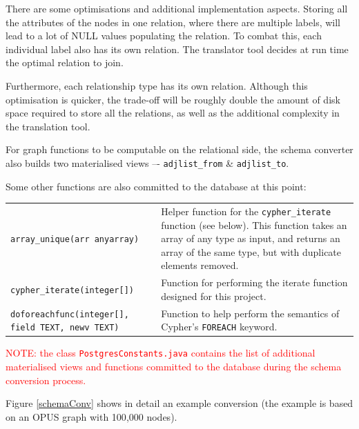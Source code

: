 \documentclass[letterpaper]{ltxdoc}
\begin{document}
There are some optimisations and additional implementation aspects. Storing all the attributes of the nodes in one relation, where there are multiple labels, will lead to a lot of NULL values populating the relation. To combat this, each individual label also has its own relation. The translator tool decides at run time the optimal relation to join.

Furthermore, each relationship type has its own relation. Although this optimisation is quicker, the trade-off will be roughly double the amount of disk space required to store all the relations, as well as the additional complexity in the translation tool.

For graph functions to be computable on the relational side, the schema converter also builds two materialised views –- \texttt{adjlist\_from} \& \texttt{adjlist\_to}.

Some other functions are also committed to the database at this point:

\begin{center}
\begin{tabular}{ p{4.5cm} p{9cm} }
\texttt{array\_unique(arr anyarray)} & Helper function for the \texttt{cypher\_iterate} function (see below). This function takes an array of any type as input, and returns an array of the same type, but with duplicate elements removed. \\

\texttt{cypher\_iterate(integer[])} & Function for performing the iterate function designed for this project. \\

\texttt{doforeachfunc(integer[], field TEXT, newv TEXT)} & Function to help perform the semantics of Cypher’s \texttt{FOREACH} keyword.
\end{tabular}
\end{center}

\medskip

\textcolor{red}{NOTE: the class \texttt{PostgresConstants.java} contains the list of additional materialised views and functions committed to the database during the schema conversion process.}

\medskip

Figure \ref{schemaConv} shows in detail an example conversion (the example is based on an OPUS graph with 100{,}000 nodes).
\end{document}
